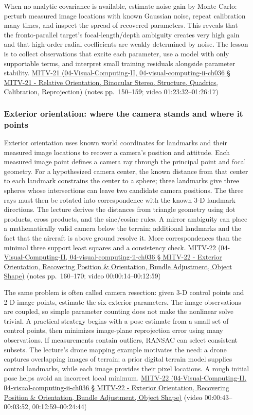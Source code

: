 When no analytic covariance is available, estimate noise gain by Monte Carlo: perturb measured image locations with known Gaussian noise, repeat calibration many times, and inspect the spread of recovered parameters. This reveals that the fronto-parallel target's focal-length/depth ambiguity creates very high gain and that high-order radial coefficients are weakly determined by noise. The lesson is to collect observations that excite each parameter, use a model with only supportable terms, and interpret small training residuals alongside parameter stability. \href{}{MITV-21 (04-Visual-Computing-II, 04-visual-computing-ii-ch036 § MITV-21 - Relative Orientation, Binocular Stereo, Structure, Quadrics, Calibration, Reprojection)} (notes pp.~150--159; video 01:23:32--01:26:17)

\subsubsection{Exterior orientation: where the camera stands and where it points}\label{exterior-orientation-where-the-camera-stands-and-where-it-points}

Exterior orientation uses known world coordinates for landmarks and their measured image locations to recover a camera's position and attitude. Each measured image point defines a camera ray through the principal point and focal geometry. For a hypothesized camera center, the known distance from that center to each landmark constrains the center to a sphere; three landmarks give three spheres whose intersections can leave two candidate camera positions. The three rays must then be rotated into correspondence with the known 3-D landmark directions. The lecture derives the distances from triangle geometry using dot products, cross products, and the sine/cosine rules. A mirror ambiguity can place a mathematically valid camera below the terrain; additional landmarks and the fact that the aircraft is above ground resolve it. More correspondences than the minimal three support least squares and a consistency check. \href{}{MITV-22 (04-Visual-Computing-II, 04-visual-computing-ii-ch036 § MITV-22 - Exterior Orientation, Recovering Position \& Orientation, Bundle Adjustment, Object Shape)} (notes pp.~160--170; video 00:00:14--00:12:59)

The same problem is often called camera resection: given 3-D control points and 2-D image points, estimate the six exterior parameters. The image observations are coupled, so simple parameter counting does not make the nonlinear solve trivial. A practical strategy begins with a pose estimate from a small set of control points, then minimizes image-plane reprojection error using many observations. If measurements contain outliers, RANSAC can select consistent subsets. The lecture's drone mapping example motivates the need: a drone captures overlapping images of terrain; a prior digital terrain model supplies control landmarks, while each image provides their pixel locations. A rough initial pose helps avoid an incorrect local minimum. \href{}{MITV-22 (04-Visual-Computing-II, 04-visual-computing-ii-ch036 § MITV-22 - Exterior Orientation, Recovering Position \& Orientation, Bundle Adjustment, Object Shape)} (video 00:00:43--00:03:52, 00:12:59--00:24:44)

